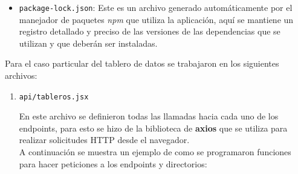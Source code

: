 \begin{itemize}
    \item \texttt{package-lock.json}: Este es un archivo generado automáticamente por el manejador de paquetes \textit{npm} que utiliza la aplicación, aquí se mantiene un registro detallado y preciso de las versiones de las dependencias que se utilizan y que deberán ser instaladas.
\end{itemize}

Para el caso particular del tablero de datos se trabajaron en los siguientes archivos:

\begin{enumerate}
    \item \texttt{api/tableros.jsx}

    En este archivo se definieron todas las llamadas hacia cada uno de los endpoints, para esto se hizo de la biblioteca de \textbf{axios} que se utiliza para realizar solicitudes HTTP desde el navegador. \\

    A continuación se muestra un ejemplo de como se programaron funciones para hacer peticiones a los endpoints y directorios:


\end{enumerate}
